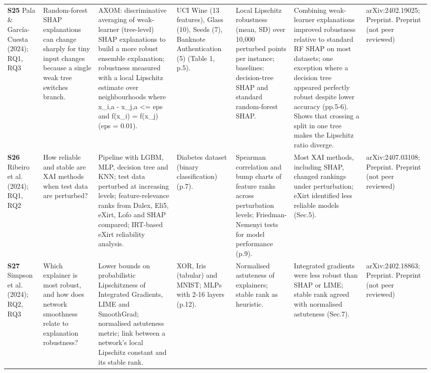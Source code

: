 \begin{longtable}{@{}P{1.55cm}P{2.9cm}P{4.5cm}P{3.2cm}P{3.4cm}P{4.6cm}P{3.6cm}@{}}
\textbf{S25} \cite{S25} Pala \& García-Cuesta (2024); RQ1, RQ3 & Random-forest SHAP explanations can change sharply for tiny input changes because a single weak tree switches branch. & AXOM: discriminative averaging of weak-learner (tree-level) SHAP explanations to build a more robust ensemble explanation; robustness measured with a local Lipschitz estimate over neighbourhoods where \textbar{}x\_\allowbreak{}i,a - x\_\allowbreak{}j,a\textbar{} \textless{}= eps and f(x\_\allowbreak{}i) = f(x\_\allowbreak{}j) (eps = 0.01). & UCI Wine (13 features), Glass (10), Seeds (7), Banknote Authentication (5) (Table 1, p.5). & Local Lipschitz robustness (mean, SD) over 10,000 perturbed points per instance; baselines: decision-tree SHAP and standard random-forest SHAP. & Combining weak-learner explanations improved robustness relative to standard RF SHAP on most datasets; one exception where a decision tree appeared perfectly robust despite lower accuracy (pp.5-6). Shows that crossing a split in one tree makes the Lipschitz ratio diverge. & arXiv:2402.19025; Preprint. Preprint (not peer reviewed) \\
\textbf{S26} \cite{S26} Ribeiro et al. (2024); RQ1, RQ2 & How reliable and stable are XAI methods when test data are perturbed? & Pipeline with LGBM, MLP, decision tree and KNN; test data perturbed at increasing levels; feature-relevance ranks from Dalex, Eli5, eXirt, Lofo and SHAP compared; IRT-based eXirt reliability analysis. & Diabetes dataset (binary classification) (p.7). & Spearman correlation and bump charts of feature ranks across perturbation levels; Friedman-Nemenyi tests for model performance (p.9). & Most XAI methods, including SHAP, changed rankings under perturbation; eXirt identified less reliable models (Sec.5). & arXiv:2407.03108; Preprint. Preprint (not peer reviewed) \\
\textbf{S27} \cite{S27} Simpson et al. (2024); RQ2, RQ3 & Which explainer is most robust, and how does network smoothness relate to explanation robustness? & Lower bounds on probabilistic Lipschitzness of Integrated Gradients, LIME and SmoothGrad; normalised astuteness metric; link between a network's local Lipschitz constant and its stable rank. & XOR, Iris (tabular) and MNIST; MLPs with 2-16 layers (p.12). & Normalised astuteness of explainers; stable rank as heuristic. & Integrated gradients were less robust than SHAP or LIME; stable rank agreed with normalised astuteness (Sec.7). & arXiv:2402.18863; Preprint. Preprint (not peer reviewed) \\

\end{longtable}
